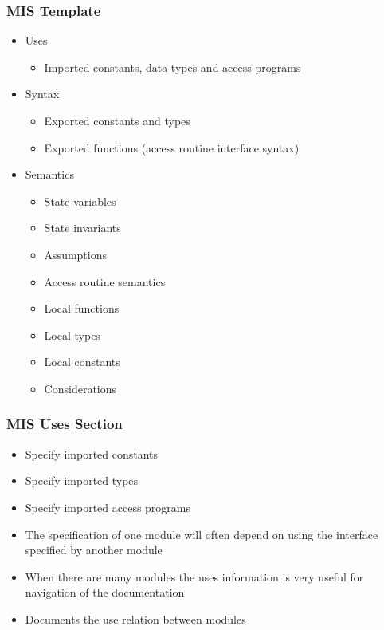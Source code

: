\documentclass[t,12pt,numbers,fleqn]{beamer}
\begin{document}

\begin{frame}
\frametitle{MIS Template}

\begin{itemize}
\item Uses
\begin{itemize}
\item Imported constants, data types and access programs
\end{itemize}
\item Syntax
\begin{itemize}
\item Exported constants and types
\item Exported functions (access routine interface syntax)
\end{itemize}
\item Semantics
\begin{itemize}
\item State variables
\item State invariants
\item Assumptions
\item Access routine semantics
\item Local functions
\item Local types
\item Local constants
\item Considerations
\end{itemize}
\end{itemize}
\end{frame}


\begin{frame}
\frametitle{MIS Uses Section}
\begin{itemize}
\item Specify imported constants
\item Specify imported types
\item Specify imported access programs
\item The specification of one module will often depend on using the interface specified by another module
\item When there are many modules the uses information is very useful for navigation of the documentation
\item Documents the use relation between modules
\end{itemize}
\end{frame}
\end{document}
